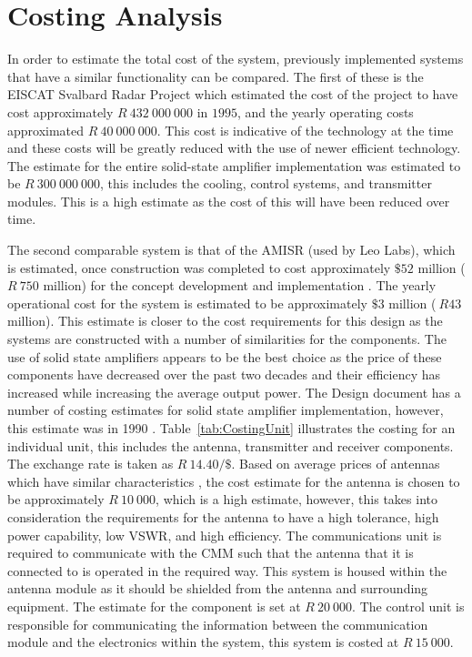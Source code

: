 \documentclass[11pt]{witseiepaper}
\begin{document}
\section{Costing Analysis} \label{sec:CostingAnalysis}

In order to estimate the total cost of the system, previously implemented systems that have a similar functionality can be compared. The first of these is the EISCAT Svalbard Radar Project \cite[p.~670]{EISCATPrice} which estimated the cost of the project to have cost approximately $R~432~000~000$ in $1995$, and the yearly operating costs approximated $R~40~000~000$. This cost is indicative of the technology at the time and these costs will be greatly reduced with the use of newer efficient technology.
The estimate for the entire solid-state amplifier implementation was estimated to be $R~300~000~000$, this includes the cooling, control systems, and transmitter modules. This is a high estimate as the cost of this will have been reduced over time.

The second comparable system is that of the AMISR (used by Leo Labs), which is estimated, once construction was completed to cost approximately $\$52$ million ($R~750$ million) for the concept development and implementation \cite[p.~333-337]{AMISRCosting}. The yearly operational cost for the system is estimated to be approximately $\$3$ million ($~R43$ million). This estimate is closer to the cost requirements for this design as the systems are constructed with a number of similarities for the components.
The use of solid state amplifiers appears to be the best choice as the price of these components have decreased over the past two decades and their efficiency has increased while increasing the average output power.
The Design document has a number of costing estimates for solid state amplifier implementation, however, this estimate was in 1990 \cite[p.~37]{DesignDraft}.
Table~\ref{tab:CostingUnit} illustrates the costing for an individual unit, this includes the antenna, transmitter and receiver components. The exchange rate is taken as $R~14.40/\$$.
Based on average prices of antennas which have similar characteristics \cite{AntennaPrice1,AntennaPrice2,AntennaPrice3,AntennaPrice4,AntennaPrice5}, the cost estimate for the antenna is chosen to be approximately $R~10~000$, which is a high estimate, however, this takes into consideration the requirements for the antenna to have a high tolerance, high power capability, low VSWR, and high efficiency. The communications unit is required to communicate with the CMM such that the antenna that it is connected to is operated in the required way. This system is housed within the antenna module as it should be shielded from the antenna and surrounding equipment. The estimate for the component is set at $R~20~000$. The control unit is responsible for communicating the information between the communication module and the electronics within the system, this system is costed at $R~15~000$.
\end{document}
